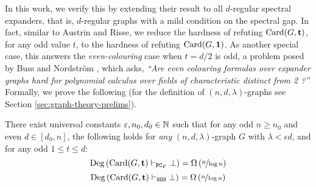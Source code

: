 \documentclass[11pt]{article}
\begin{document}
In this work, we verify this by extending their result to all $d$-regular spectral expanders, that is, $d$-regular graphs with a mild condition on the spectral gap.
In fact, similar to Austrin and Risse, we reduce the hardness of refuting $\text{Card}(G, \mathbf{t})$, for any odd value $t$, to the hardness of refuting $\text{Card}(G, \mathbf{1})$.
As another special case, this answers the \emph{even-colouring} case when $t = d/2$ is odd, a problem posed by Buss and Nordstr\"{o}m \citep[Open Problem 7.7]{buss2021proof}, which asks, \textit{``Are even colouring formulas over expander graphs hard for polynomial calculus over fields of characteristic distinct from 2 ?''}
Formally, we prove the following (for the definition of $(n, d, \lambda)$-graphs see Section \ref{sec:graph-theory-prelims}).


\begin{theorem}\label{thm:general-hardness-result}

  There exist universal constants $\varepsilon, n_0, d_0 \in \mathbb{N}$ such that for any odd $n \ge n_0$ and even $d \in [d_0, n]$, the following holds for \emph{any} $(n, d, \lambda)$-graph $G$ with $\lambda < \epsilon d$, and for any odd $1 \leq t \leq d$:  
  \[ \text{Deg}\left(\text{Card}(G, \mathbf{t}) \vdash_{\texttt{PC}_F} \bot\right) = \Omega\left(\nicefrac{n}{\log n}\right)\]
  \[ \text{Deg}\left(\text{Card}(G, \mathbf{t}) \vdash_{\texttt{SOS}} \bot\right) = \Omega\left(\nicefrac{n}{\log n}\right)\]  
\end{theorem}
\end{document}
